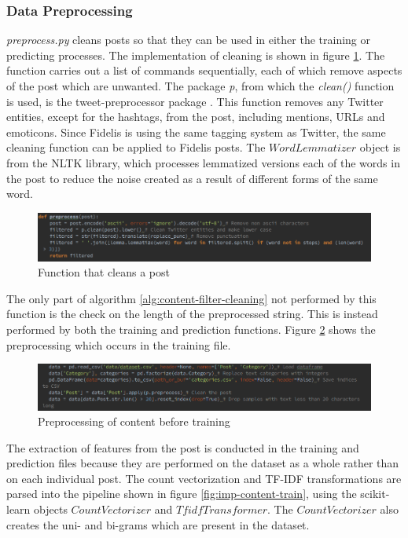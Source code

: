 \subsubsection{Data Preprocessing}
\textit{preprocess.py} cleans posts so that they can be used in either the training or predicting processes. The implementation of cleaning is shown in figure \ref{fig:content-clean}. The function carries out a list of commands sequentially, each of which remove aspects of the post which are unwanted. The package \textit{p}, from which the \textit{clean()} function is used, is the tweet-preprocessor package \cite{TweetPreprocessor}. This function removes any Twitter entities, except for the hashtags, from the post, including mentions, URLs and emoticons. Since Fidelis is using the same tagging system as Twitter, the same cleaning function can be applied to Fidelis posts. The $WordLemmatizer$ object is from the NLTK library, which processes lemmatized versions each of the words in the post to reduce the noise created as a result of different forms of the same word. 

\begin{figure}[H]
\centering
\includegraphics[width=\textwidth]{Images/Implementation/content-clean}
\caption{Function that cleans a post}
\label{fig:content-clean}
\end{figure}

The only part of algorithm \ref{alg:content-filter-cleaning} not performed by this function is the check on the length of the preprocessed string. This is instead performed by both the training and prediction functions. Figure \ref{fig:content-preprocess} shows the preprocessing which occurs in the training file.

\begin{figure}[H]
\centering
\includegraphics[width=\textwidth]{Images/Implementation/content-preprocess}
\caption{Preprocessing of content before training}
\label{fig:content-preprocess}
\end{figure}

The extraction of features from the post is conducted in the training and prediction files because they are performed on the dataset as a whole rather than on each individual post. The count vectorization and TF-IDF transformations are parsed into the pipeline shown in figure \ref{fig:imp-content-train}, using the scikit-learn objects $CountVectorizer$ and $TfidfTransformer$. The $CountVectorizer$ also creates the uni- and bi-grams which are present in the dataset.

